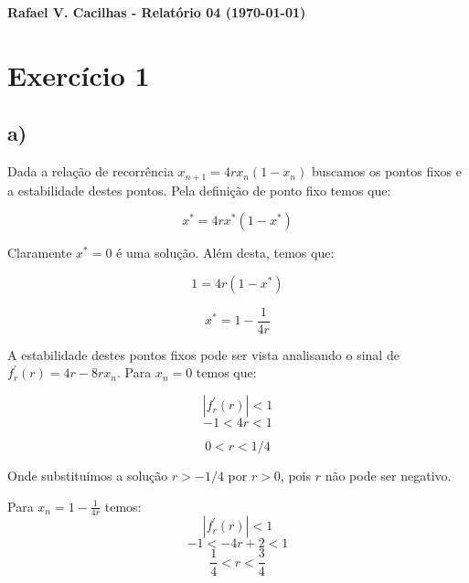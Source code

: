 \documentclass[a4wide]{report}
\begin{document}
\noindent
{\bf Rafael V. Cacilhas  - Relatório 04 (\today)}

\vspace{0.5cm}

\section*{Exercício 1}

\subsection*{a) }

Dada a relação de recorrência $x_{n+1} = 4rx_n(1-x_n)$ buscamos os pontos fixos e a estabilidade destes pontos. Pela definição de ponto fixo temos que:

\begin{equation*}
x^* = 4rx^*(1-x^*)
\end{equation*}

Claramente $x^* = 0$ é uma solução. Além desta, temos que:

\begin{equation*}
1 = 4r(1-x^*)
\end{equation*}

\begin{equation}
x^* = 1 - \frac{1}{4r}
\end{equation}

A estabilidade destes pontos fixos pode ser vista analisando o sinal de $f^{'}_{r}(r) = 4r - 8rx_n$. Para $x_n = 0$ temos que:


\begin{equation*}
|f^{'}_{r}(r)| < 1
\end{equation*}
\begin{equation*}
-1 <  4r  < 1
\end{equation*}

\begin{equation}
0 <  r  < 1/4
\end{equation}

Onde substituimos a solução $r > -1/4$ por $r > 0$, pois $r$ não pode ser negativo.

Para $x_n = 1 - \frac{1}{4r}$ temos:
\begin{equation*}
|f^{'}_{r}(r)| < 1
\end{equation*}
\begin{equation*}
-1 <  -4r + 2  < 1
\end{equation*}
\begin{equation}
\frac{1}{4} <  r  < \frac{3}{4}
\end{equation}
\end{document}
